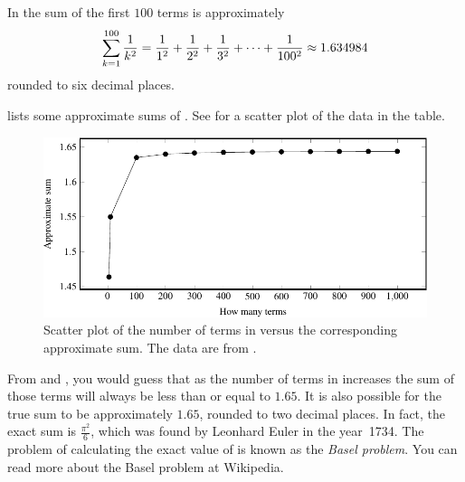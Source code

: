 \documentclass[a4paper,oneside,12pt]{article}
\begin{document}
\begin{problem}
{\begin{solution}
In  the sum of the first $100$ terms is
approximately
\[
\sum_{k=1}^{100} \frac{1}{k^2}
=
{
  \frac{1}{1^2}
  +
  \frac{1}{2^2}
} + {
  \frac{1}{3^2}
} + \cdots + {
  \frac{1}{100^2}
}
\approx
1.634984
\]
rounded to six decimal places.

 lists some approximate sums
of .  See
 for a scatter plot of the
data in the table.

\begin{table}[!htbp]
\centering

\caption{%
  Approximate sums of .
}
\label{tab:Basel_problem_approximate_sums}
\end{table}

\begin{figure}[!htbp]
\centering
\includegraphics[scale=1]{image/07/basel-problem-scatterplot.pdf}
\caption{%
  Scatter plot of the number of terms in
   versus the corresponding approximate
  sum.  The data are from .
}
\label{fig:Basel_problem_approximate_sums}
\end{figure}

From  and
, you would guess that as
the number of terms in  increases the
sum of those terms will always be less than or equal to $1.65$.  It is
also possible for the true sum to be approximately $1.65$, rounded to
two decimal places.  In fact, the exact sum is $\frac{\pi^2}{6}$,
which was found by Leonhard Euler in the year~1734.  The problem of
calculating the exact value of  is known
as the \emph{Basel problem}.  You can read more about the Basel
problem at Wikipedia.
\end{solution}
}{}
\end{problem}
\end{document}
